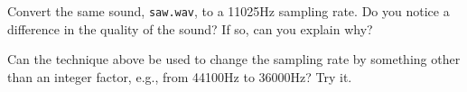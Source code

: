 \begin{problem}
Convert the same sound, \texttt{saw.wav}, to a 11025Hz sampling rate. Do you notice a difference in the quality of the sound? If so, can you explain why?
\end{problem}

\begin{problem}
Can the technique above be used to change the sampling rate by something other than an integer factor, e.g., from 44100Hz to 36000Hz? Try it.
\end{problem}

